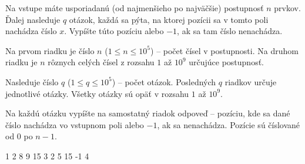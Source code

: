 





Na vstupe máte usporiadanú (od najmenšieho po najväčšie) postupnosť $n$ prvkov. Ďalej nasleduje $q$
otázok, každá sa pýta, na ktorej pozícii sa v tomto poli nachádza číslo $x$. Vypíšte túto pozíciu
alebo $-1$, ak sa tam číslo nenachádza.


Na prvom riadku je číslo $n$ ($1 \leq n \leq 10^5$) -- počet čísel v postupnosti.
Na druhom riadku je $n$ rôznych celých čísel z rozsahu $1$ až $10^9$ určujúce postupnosť.

Nasleduje číslo $q$ ($1 \leq q \leq 10^5$) -- počet otázok. Posledných $q$ riadkov určuje jednotlivé
otázky. Všetky otázky sú opäť v rozsahu $1$ až $10^9$.


Na každú otázku vypíšte na samostatný riadok odpoveď -- pozíciu, kde sa dané číslo nachádza vo
vstupnom poli alebo $-1$, ak sa nenachádza. Pozície sú číslované od $0$ po $n-1$.


1 2 8 9 15
3
2
5
15
-1
4
\koniec


